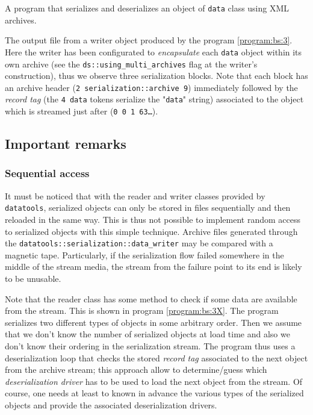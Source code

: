 \documentclass[a4paper,12pt]{article}
\newcommand{\basepath}{.}
\newcommand{\codingpath}{\basepath/coding}
\newcommand{\pn}{\par\noindent}
\newcommand{\TT}[1]{"\texttt{#1}"}
\begin{document}
\begin{program}[h]
\VerbatimInput[frame=single,
numbers=left,
numbersep=2pt,
firstline=1,
fontsize=\footnotesize,
showspaces=false]{\codingpath/data_3.cxx}
\caption{A program that serializes and deserializes an 
object of \texttt{data} class using XML archives.
}
\label{program:bs:3}
\end{program}

\begin{sample}[h]
\VerbatimInput[frame=single,
numbers=left,
numbersep=2pt,
firstline=1,
fontsize=\footnotesize,
showspaces=false]{\codingpath/data_3.txt.out}
\caption{The output file from a writer object produced by the program
  \ref{program:bs:3}. 
Here the writer has been configurated to \emph{encapsulate} each \texttt{data} object
within its own archive (see the \texttt{ds::using\_multi\_archives} flag at
 the writer's construction), thus we observe three serialization blocks. Note that each block
has an archive header (\texttt{2 serialization::archive 9}) 
immediately followed by the  \emph{record tag} (the \texttt{4 data} tokens serialize
the \TT{data} string) associated to the object which is streamed just after (\texttt{0 0 1 63\dots}).
}
\label{sample:bs:3}
\end{sample}
\clearpage

\subsection{Important remarks}

\subsubsection{Sequential access}

\pn  It  must be  noticed  that with  the  reader  and writer  classes
provided by \texttt{datatools}, serialized  objects can only be stored
in files sequentially and then reloaded  in the same way. This is thus
not  possible to implement  random access  to serialized  objects with
this   simple  technique.    Archive  files   generated   through  the
\texttt{datatools::serialization::data\_writer} may be compared with a
magnetic  tape.   Particularly,   if  the  serialization  flow  failed
somewhere  in the  middle of  the stream  media, the  stream  from the
failure point to its end is likely to be unusable.


\pn Note that  the reader class has some method to  check if some data
are   available  from   the  stream.    This  is   shown   in  program
\ref{program:bs:3X}.   The program serializes  two different  types of
objects in  some arbitrary order.  Then  we assume that  we don't know
the number of  serialized objects at load time and  also we don't know
their ordering in  the serialization stream.  The program  thus uses a
deserialization  loop   that  checks  the   stored  \emph{record  tag}
associated to the  next object from the archive  stream; this approach
allow to determine/guess which \emph{deserialization driver} has to be
used to load the next object from the stream.  Of course, one needs at
least to known in advance  the various types of the serialized objects
and provide the associated deserialization drivers.
\end{document}
